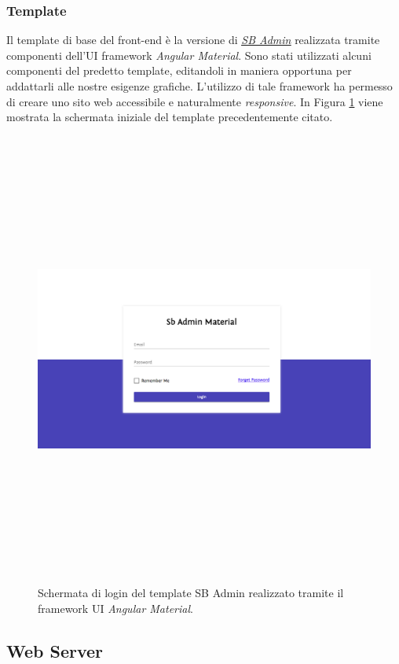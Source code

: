 \subsubsection{Template}
Il template di base del front-end è la versione di \href{https://startangular.com/product/sb-admin-material/}{\textit{\underline{SB Admin}}} realizzata tramite componenti dell'UI framework \textit{Angular Material}. Sono stati utilizzati alcuni componenti del predetto template, editandoli in maniera opportuna per addattarli alle nostre esigenze grafiche. L'utilizzo di tale framework ha permesso di creare uno sito web accessibile e  naturalmente \textit{responsive}.
In Figura \ref{fig:sb-admin-login} viene mostrata la schermata iniziale del template precedentemente citato.
\begin{figure}
  \centering
  \includegraphics[height=15cm, width=12cm,
		keepaspectratio]{images/sb-admin.png}
  \caption{Schermata di login del template SB Admin realizzato tramite il framework UI \textit{Angular Material}.}
  \label{fig:sb-admin-login}
\end{figure}

\subsection{Web Server}
